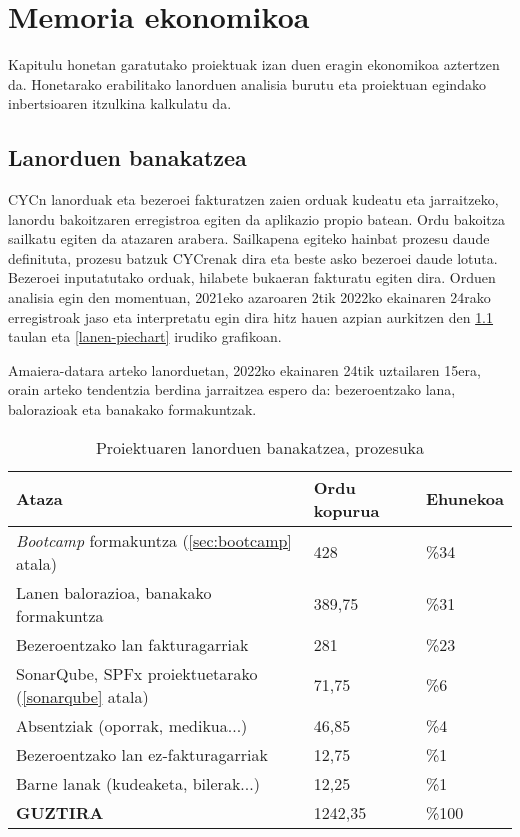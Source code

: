 \chapter{Memoria ekonomikoa}


     Kapitulu honetan garatutako proiektuak izan duen eragin ekonomikoa aztertzen da. Honetarako erabilitako lanorduen analisia burutu eta proiektuan egindako inbertsioaren itzulkina kalkulatu da. 


\section{Lanorduen banakatzea}\label{sec:lanen-banakatzea}
CYCn lanorduak eta bezeroei fakturatzen zaien orduak kudeatu eta jarraitzeko, lanordu bakoitzaren erregistroa egiten da aplikazio propio batean. Ordu bakoitza sailkatu egiten da atazaren arabera.
Sailkapena egiteko hainbat prozesu daude definituta, prozesu batzuk CYCrenak dira eta beste asko bezeroei daude lotuta. Bezeroei inputatutako orduak, hilabete bukaeran fakturatu egiten dira.
Orduen analisia egin den momentuan, 2021eko azaroaren 2tik 2022ko ekainaren 24rako erregistroak jaso eta interpretatu egin dira hitz hauen azpian aurkitzen den \ref{lanen-banakatzea} taulan eta \ref{lanen-piechart} irudiko grafikoan.

Amaiera-datara arteko lanorduetan, 2022ko ekainaren 24tik uztailaren 15era, orain arteko tendentzia berdina jarraitzea espero da: bezeroentzako lana, balorazioak eta banakako formakuntzak. 

\vspace{1cm}
\begin{table}[H]
\centering
{}
\def\arraystretch{1.5}%
\begin{tabular}{ p{8.5cm} p{2.75cm} p{2cm} }
\hline
\textbf{Ataza} & \textbf{Ordu kopurua} & \textbf{Ehunekoa}\\
\hline
\textit{Bootcamp} formakuntza (\ref{sec:bootcamp} atala) & 428 & \%34 \\
Lanen balorazioa, banakako formakuntza  & 389,75 & \%31 \\
Bezeroentzako lan fakturagarriak  & 281 & \%23 \\
SonarQube, SPFx proiektuetarako (\ref{sonarqube} atala)  & 71,75 & \%6 \\
Absentziak (oporrak, medikua...) & 46,85 & \%4 \\
Bezeroentzako lan ez-fakturagarriak & 12,75 & \%1 \\
Barne lanak (kudeaketa, bilerak...) & 12,25 & \%1 \\
\hline
\textbf{GUZTIRA} & 1242,35 & \%100 \\
\hline
\end{tabular}
\caption{Proiektuaren lanorduen banakatzea, prozesuka}
\label{lanen-banakatzea}
\end{table}
\vfill


